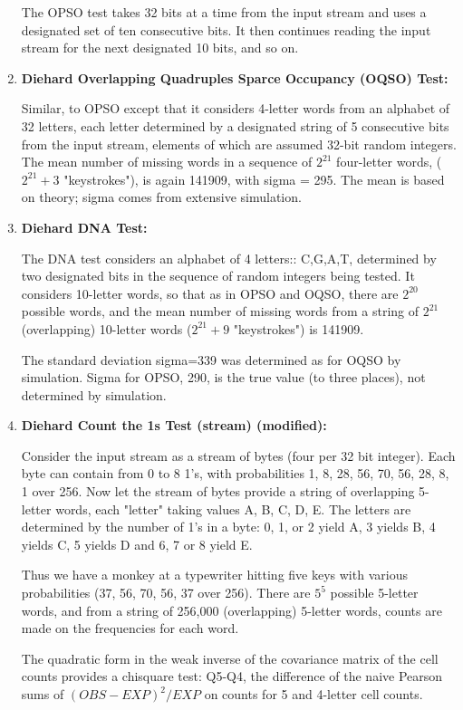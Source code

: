 \documentclass[titlepage, 11pt]{article}
\begin{document}
\begin{enumerate}
The OPSO test takes 32 bits at a time from the input stream and uses a designated set of ten consecutive bits. It then continues reading the input stream for the next designated 10 bits, and so on.   


\item {\textbf{Diehard Overlapping Quadruples Sparce Occupancy (OQSO) Test:}}


Similar, to OPSO except that it considers 4-letter words from an alphabet of 32 letters, each letter determined by a designated string of 5 consecutive bits from the input stream, elements of which are assumed 32-bit random integers. The mean number of missing words in a sequence of $2^{21}$ four-letter words, ($2^{21}+3$ "keystrokes"), is again 141909, with sigma = 295.  The mean is based on theory; sigma comes from extensive simulation.  


\item {\textbf{Diehard DNA Test:}}


The DNA test considers an alphabet of 4 letters::  C,G,A,T, determined by two designated bits in the sequence of random integers being tested.  It considers 10-letter words, so that as in OPSO and OQSO, there are $2^{20}$ possible words, and the mean number of missing words from a string of $2^{21}$  (overlapping) 10-letter  words ($2^{21}+9$ "keystrokes") is 141909.


The standard deviation sigma=339 was determined as for OQSO by simulation. Sigma for OPSO, 290, is the true value (to three places), not determined by simulation.


\item {\textbf{Diehard Count the 1s Test (stream) (modified):}}


Consider the input stream as a stream of bytes (four per 32 bit integer).  Each byte can contain from 0 to 8 1's, with probabilities 1, 8, 28, 56, 70, 56, 28, 8, 1 over 256. Now let the stream of bytes provide a string of overlapping  5-letter words, each "letter" taking values A, B, C, D, E. The letters are determined by the number of 1's in a byte:  0, 1, or 2 yield A, 3 yields B, 4 yields C, 5 yields D and 6, 7 or 8 yield E. 


Thus we have a monkey at a typewriter hitting five keys with various probabilities (37, 56, 70, 56, 37 over 256). There are $5^{5}$ possible 5-letter words, and from a string of 256,000 (overlapping) 5-letter words, counts are made on the frequencies for each word. 


The quadratic form in the weak inverse of the covariance matrix of the cell counts provides a chisquare test:  Q5-Q4, the difference of the naive Pearson sums of $(OBS-EXP)^2/EXP$ on counts for 5 and 4-letter cell counts. 



\end{enumerate}
\end{document}
